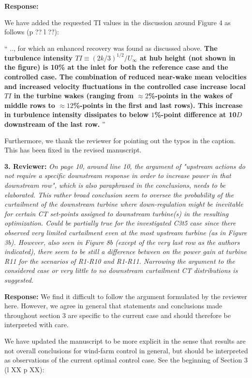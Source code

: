 \documentclass[]{article}
\begin{document}
\textbf{Response: }

We have added the requested TI values in the discussion around Figure 4 as follows (p ?? l ??):

``
.., for which an enhanced recovery was found as discussed above. \textbf{The turbulence intensity $TI \equiv (2k/3  )^{1/2}/U_\infty$ at hub height (not shown in the figure) is 10\% at the inlet for both the reference case and the controlled case. The combination of reduced near-wake mean velocities and increased velocity fluctuations in the controlled case increase local $TI$ in the turbine wakes (ranging from $\approx 2$\%-points in the wakes of middle rows to $\approx 12$\%-points in the first and last rows). This increase in turbulence intensity dissipates to below $1$\%-point difference at 10$D$ downstream of the last row.}
''

Furthermore, we thank the reviewer for pointing out the typos in the caption. This has been fixed in the revised manuscript.

\dotfill

\textbf{3. Reviewer: } \textit{On page 10, around line 10, the argument of "upstream actions do not require a
	specific downstream response in order to increase power in that downstream row",
	which is also paraphrased in the conclusions, needs to be elaborated. This rather
	broad conclusion seem to oversee the probability of the curtailment of the downstream
	turbine where down-regulation might be inevitable for certain CT set-points assigned
	to downstream turbine(s) in the resulting optimization. Could be partially true for the
	investigated C3t5 case since there observed very limited curtailment even at the most
	upstream turbine (as in Figure 3b). However, also seen in Figure 8b (except of the
	very last row as the authors indicated), there seem to be still a difference between on
	the power gain at turbine R11 for the scenarios of R1-R10 and R1-R11. Narrowing the argument to the considered case or very little to no downstream curtailment CT
	distributions is suggested.}

\textbf{Response: } We find it difficult to follow the argument formulated by the reviewer here. However, we agree in general that statements and conclusions made throughout section 3 are specific to the current case and should therefore be interpreted with care. 

We have updated the manuscript to be more explicit in the sense that results are not overall conclusions for wind-farm control in general, but should be interpreted as observations of the current optimal control case. See the beginning of Section 3 (l XX p XX):
\end{document}
